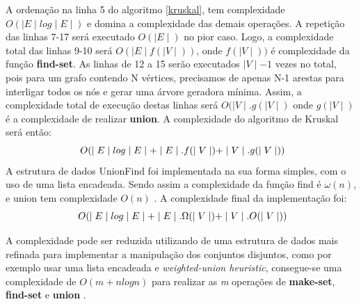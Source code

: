 \documentclass[a4paper,12pt]{article}
\begin{document}
A ordenação na linha 5 do algoritmo \ref{kruskal}, tem complexidade \emph{ $O( \mid E\mid log \mid E\mid )$ } e domina a complexidade das demais operações.
A repetição das linhas 7-17 será executado \emph{$O(\mid E\mid)$} no pior caso.
Logo, a complexidade total das linhas 9-10 será \emph{$O(\mid E\mid f(\mid V\mid))$}, onde $f(\mid V\mid))$ é complexidade da função \textbf{{\color{blue}find-set}}.
As linhas de 12 a 15 serão executados $\mid V\mid -1$ vezes no total, pois para um grafo contendo N vértices, precisamos de apenas N-1 arestas para interligar todos os nós e gerar uma árvore geradora mínima. 
Assim, a complexidade total de execução destas linhas será \emph{ $O(\mid V\mid . g(\mid V\mid)$} onde $g(\mid V\mid)$ é a complexidade de realizar \textbf{{\color{blue}union}}.
A complexidade do algoritmo de Kruskal será então: \[ \emph{ $O(\mid E\mid log \mid E\mid + \mid E\mid .f(\mid V\mid) + \mid V\mid . g(\mid V\mid)) $}\]
A estrutura de dados UnionFind foi implementada na sua forma simples, com o uso de uma lista encadeada. Sendo assim a complexidade da função find é \emph{$\omega(n)$}, e union tem complexidade \emph{$O(n)$} \cite{Cormem}. A complexidade final da implementação foi:
\[ \emph{ $O(\mid E\mid log \mid E\mid + \mid E\mid .\Omega(\mid V\mid) + \mid V\mid . O(\mid V\mid)) $}\]

A complexidade pode ser reduzida utilizando de uma estrutura de dados mais refinada para implementar a manipulação dos conjuntos disjuntos, como por exemplo usar uma lista encadeada e \emph{weighted-union heuristic}\cite{Cormem}, consegue-se uma complexidade de \emph{$O(m+nlogn) $} para realizar as \emph{m} operações de \textbf{{\color{blue}make-set}}, \textbf{{\color{blue}find-set}} e \textbf{{\color{blue}union}} \cite{Cormem}.

%
\end{document}
